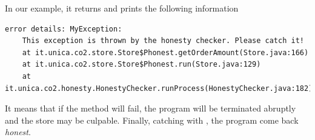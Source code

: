In our example, it returns  and prints the following information
\begin{mdframed}
  \begin{verbatim}
error details: MyException: 
    This exception is thrown by the honesty checker. Please catch it!
    at it.unica.co2.store.Store$Phonest.getOrderAmount(Store.java:166)
    at it.unica.co2.store.Store$Phonest.run(Store.java:129)
    at it.unica.co2.honesty.HonestyChecker.runProcess(HonestyChecker.java:182)
  \end{verbatim}
\end{mdframed}
It means that if the method  will fail,
the program will be terminated abruptly and the store may be culpable.
Finally, catching  with ,
the program come back \emph{honest}.

